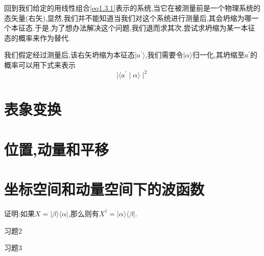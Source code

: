 \documentclass[lang=cn,newtx,10pt,scheme=chinese,thmcnt=section]{elegantbook}
\begin{document}
回到我们给定的用线性组合\ref{eq1.3.1}表示的系统,当它在被测量前是一个物理系统的态矢量(右矢),显然,我们并不能知道当我们对这个系统进行测量后,其会坍缩为哪一个本征态.于是,为了想办法解决这个问题,我们退而求其次,尝试求坍缩为某一本征态的概率来作为替代.

我们假定经过测量后,该右矢坍缩为本征态$|a^{'}\rangle$,我们需要令$|\alpha\rangle$归一化,其坍缩至$a^{'}$的概率可以用下式来表示
\begin{equation}
	\mid\langle a^{\prime}\mid\alpha\rangle\mid^{2}
\end{equation}



























































\section{表象变换}
\section{位置,动量和平移}
\section{坐标空间和动量空间下的波函数}
\begin{problemset}
	\item 证明:如果$X=|\beta\rangle\langle\alpha|$,那么则有$X^\dagger=|\alpha\rangle\langle\beta|$.
	\item 习题2
	\item 习题3
\end{problemset}
\end{document}

